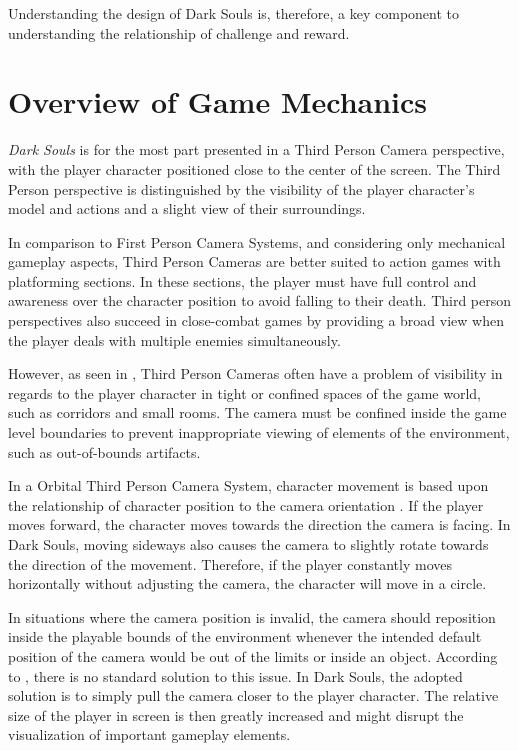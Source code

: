 Understanding the design of Dark Souls is, therefore, a key component to understanding the relationship of challenge and reward.


\section{Overview of Game Mechanics}

\emph{Dark Souls} is for the most part presented in a Third Person Camera perspective, with the player character positioned close to the center of the screen. The Third Person perspective is distinguished by the visibility of the player character's model and actions and a slight view of their surroundings.

In comparison to First Person Camera Systems, and considering only mechanical gameplay aspects, Third Person Cameras are better suited to action games with platforming sections. In these sections, the player must have full control and awareness over the character position to avoid falling to their death. Third person perspectives also succeed in close-combat games by providing a broad view when the player deals with multiple enemies simultaneously.

However, as seen in \cite{BOOK_LevelUpTheGuideToGreat}, Third Person Cameras often have a problem of visibility in regards to the player character in tight or confined spaces of the game world, such as corridors and small rooms. The camera must be confined inside the game level boundaries to prevent inappropriate viewing of elements of the environment, such as  out-of-bounds artifacts.

In a Orbital Third Person Camera System, character movement is based upon the relationship of character position to the camera orientation \cite{BOOK_RealTimeCameras}. If the player moves forward, the character moves towards the direction the camera is facing. In Dark Souls, moving sideways also causes the camera to slightly rotate towards the direction of the movement. Therefore, if the player constantly moves horizontally without adjusting the camera, the character will move in a circle.

In situations where the camera position is invalid, the camera should reposition inside the playable bounds of the environment whenever the intended default position of the camera would be out of the limits or inside an object. According to \cite{BOOK_RealTimeCameras}, there is no standard solution to this issue. In Dark Souls, the adopted solution is to simply pull the camera closer to the player character. The relative size of the player in screen is then greatly increased and might disrupt the visualization of important gameplay elements. 

